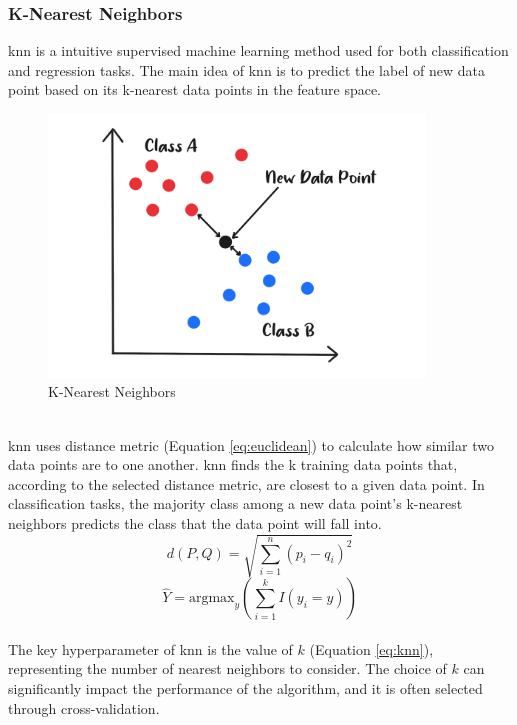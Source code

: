 \subsubsection{K-Nearest Neighbors}
\nocite{srivastava_2019_introduction}
\nocite{geeksforgeeks_2018_knearest}
\nocite{harrison_2018_machine}
\gls{knn} is a intuitive supervised machine learning method used for both classification and regression tasks. 
The main idea of \gls{knn} is to predict the label of new data point based on its k-nearest data points in the feature space. \cite{ibm_what_knn}
\\
\begin{figure}[!ht]
    \centering
    \includegraphics[width=10cm]{Images/knn.png}
    \caption{K-Nearest Neighbors}
    \label{fig:knn}
\end{figure}
\\
\indent \gls{knn} uses distance metric (Equation \ref{eq:euclidean}) to calculate how similar two data points are to one another.
\gls{knn} finds the k training data points that, according to the selected distance metric, are closest to a given data point.
In classification tasks, the majority class among a new data point's k-nearest neighbors predicts the class that the data point will fall into.
\\
\begin{equation} \label{eq:euclidean}
    d(P,Q) = \sqrt{\sum_{i=1}^{n}(p_{i} - q_{i})^{2}}
\end{equation}
\begin{equation} \label{eq:knn}
    \hat{Y} = \text{argmax}_y \left( \sum_{i=1}^{k}I(y_{i}=y) \right)
\end{equation}
\\
\indent The key hyperparameter of \gls{knn} is the value of $k$ (Equation \ref{eq:knn}), representing the number of nearest neighbors to consider.
The choice of $k$ can significantly impact the performance of the algorithm, and it is often selected through cross-validation.

